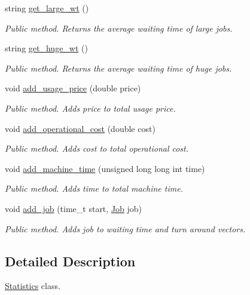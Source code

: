 \begin{DoxyCompactItemize}
string \hyperlink{classStatistics_a06c13d01f1a8ea83391628b9bf617a4f}{get\+\_\+large\+\_\+wt} ()
\begin{DoxyCompactList}\small\item\em Public method. Returns the average waiting time of large jobs. \end{DoxyCompactList}\item 
string \hyperlink{classStatistics_a17dc31579326d8463eba7dd661673f47}{get\+\_\+huge\+\_\+wt} ()
\begin{DoxyCompactList}\small\item\em Public method. Returns the average waiting time of huge jobs. \end{DoxyCompactList}\item 
void \hyperlink{classStatistics_af99eab950e1fa1a657332fface5dc13e}{add\+\_\+usage\+\_\+price} (double price)
\begin{DoxyCompactList}\small\item\em Public method. Adds price to total usage price. \end{DoxyCompactList}\item 
void \hyperlink{classStatistics_a17bca1fa9938f98e93cebd56d428f9a4}{add\+\_\+operational\+\_\+cost} (double cost)
\begin{DoxyCompactList}\small\item\em Public method. Adds cost to total operational cost. \end{DoxyCompactList}\item 
void \hyperlink{classStatistics_a726b0734f8a0c86024543190ab3092ea}{add\+\_\+machine\+\_\+time} (unsigned long long int time)
\begin{DoxyCompactList}\small\item\em Public method. Adds time to total machine time. \end{DoxyCompactList}\item 
void \hyperlink{classStatistics_a78e4c255a4999ebd6c8872eef6360427}{add\+\_\+job} (time\+\_\+t start, \hyperlink{classJob}{Job} job)
\begin{DoxyCompactList}\small\item\em Public method. Adds job to waiting time and turn around vectors. \end{DoxyCompactList}\end{DoxyCompactItemize}


\subsection{Detailed Description}
\hyperlink{classStatistics}{Statistics} class. 

